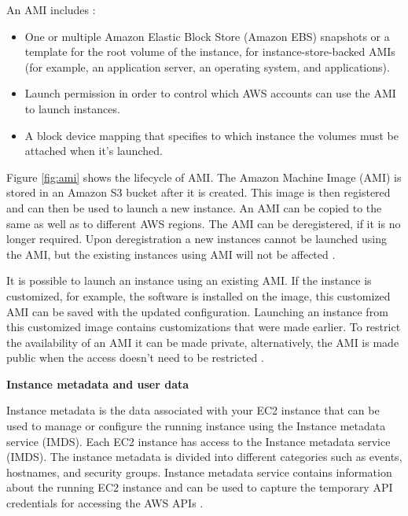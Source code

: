 \par An AMI includes \cite{30}:
\begin{itemize}
    \item One or multiple Amazon Elastic Block Store (Amazon EBS) snapshots or a template for the root volume of the instance, for instance-store-backed AMIs (for example, an application server, an operating system, and applications).
\end{itemize}
\begin{itemize}
    \item Launch permission in order to control which AWS accounts can use the AMI to launch instances.
\end{itemize}
\begin{itemize}
    \item A block device mapping that specifies to which instance the volumes must be attached when it’s launched.
\end{itemize}



\par Figure \ref{fig:ami} shows the lifecycle of AMI. The
Amazon Machine Image (AMI) is stored in an Amazon S3
bucket after it is created. This image is then registered and can then be used to launch a new instance. An AMI can be
copied to the same as well as to different AWS regions.
The AMI can be deregistered, if it is no longer required.
Upon deregistration a new instances cannot be launched
using the AMI, but the existing instances using AMI will not be affected \cite{30}.

\par It is possible to launch an instance using an existing AMI. If the instance is customized, for example, the
software is installed on the image, this customized AMI can be saved with the updated configuration. Launching an
instance from this customized image contains customizations that were made earlier. To restrict the availability of
an AMI it can be made private, alternatively, the AMI is made public when the access doesn’t need to be restricted \cite{31}.




\textbf{Instance metadata and user data}
\par Instance metadata is the data associated with your EC2 instance that can be used to manage or configure the
running instance using the Instance metadata service (IMDS). Each EC2 instance has access to the Instance metadata
service (IMDS). The instance metadata is divided into different categories such as events, hostnames, and security
groups. Instance metadata service contains information about the running EC2 instance and can be used to capture the temporary API credentials for accessing the AWS APIs \cite{32}.

